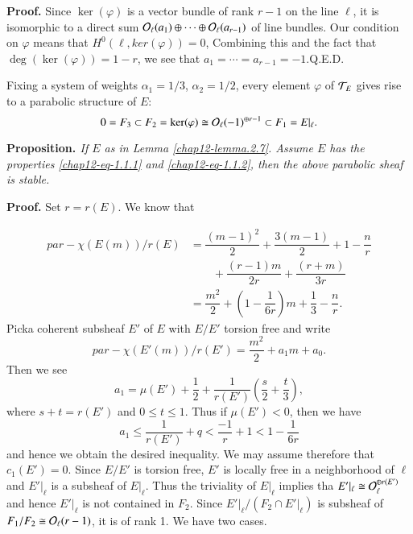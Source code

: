 \medskip
\noindent
{\bfseries Proof.} Since $\ker(\varphi)$ is a vector bundle of rank $r-1$ on the line $\ell$, it is isomorphic to a direct sum $\mathcal{O}_{\ell}(a_{1}) \oplus \cdots \oplus \mathcal{O}_{\ell}(a_{r-1})$ of line bundles. Our condition on $\varphi$ means that $H^{0}(\ell, ker(\varphi))=0$, Combining this and the fact that $\deg(\ker(\varphi))=1-r$, we see that $a_{1}=\cdots=a_{r-1}=-1$.\hfill Q.E.D. 

Fixing a system of weights $\alpha_{1} =1/3$, $\alpha_{2}=1/2$, every element $\varphi$ of $\mathcal{T}_{E}$
gives rise to a parabolic structure of $E$:
$$
0 =F_{3} \subset F_{2} =\ker(\varphi) \cong \mathcal{O}_{\ell}(-1)^{\oplus r-1} \subset F_{1}=E|_{\ell}.
$$

\medskip
\noindent
{\bfseries {} Proposition. \label{chap12-Prop.2.8}} \textit{If $E$ as in Lemma \ref{chap12-lemma.2.7}. Assume $E$ has the properties \eqref{chap12-eq-1.1.1} and \eqref{chap12-eq-1.1.2}, then the above parabolic sheaf is stable.}

\medskip
\noindent
{\bfseries Proof.} Set $r=r(E)$. We know that

\begin{equation*}
\begin{split}
par-\chi(E(m))/r(E) &= \dfrac{(m-1)^{2}}{2} + \dfrac{3(m-1)}{2} + 1 -\dfrac{n}{r}\\
 & \qquad +\dfrac{(r-1)m}{2r} + \dfrac{(r+m)}{3r}\\
 &=\dfrac{m^{2}}{2}+ \left(1 -\dfrac{1}{6r}\right)m + \dfrac{1}{3}-\dfrac{n}{r}.
\end{split}
\end{equation*}
Pick\pageoriginale a coherent subsheaf $E'$ of $E$ with $E/E'$ torsion free and write
$$
par-\chi(E'(m))/r(E')=\dfrac{m^{2}}{2} +a_{1}m +a_{0}.
$$
Then we see
$$
a_{1} = \mu(E') + \dfrac{1}{2} + \dfrac{1}{r(E')}\left(\dfrac{s}{2} +\dfrac{t}{3}\right),
$$
where $s+t =r(E')$ and $0 \leq t \leq 1$. Thus if $\mu(E') < 0$, then we have
$$
a_{1}\leq \dfrac{1}{r(E')} + q < \dfrac{-1}{r} + 1 < 1-\dfrac{1}{6r}
$$
and hence we obtain the desired inequality. We may assume therefore that $c_{1}(E')=0$. Since $E/E'$ is torsion free, $E'$ is locally free in a neighborhood of $\ell$ and $E'|_{\ell}$ is a subsheaf of $E|_{\ell}$. Thus the triviality of $E|_{\ell}$ implies tha $E'|_{\ell} \cong\mathcal{O}_{\ell}^{\oplus r(E')}$ and hence $E'|_{\ell}$ is not contained in $F_{2}$. Since $E'|_{\ell}/(F_{2}\cap E'|_{\ell})$ is subsheaf of $F_{1}/F_{2} \cong \mathcal{O}_{\ell}(r-1)$, it is of rank 1. We have two cases.

